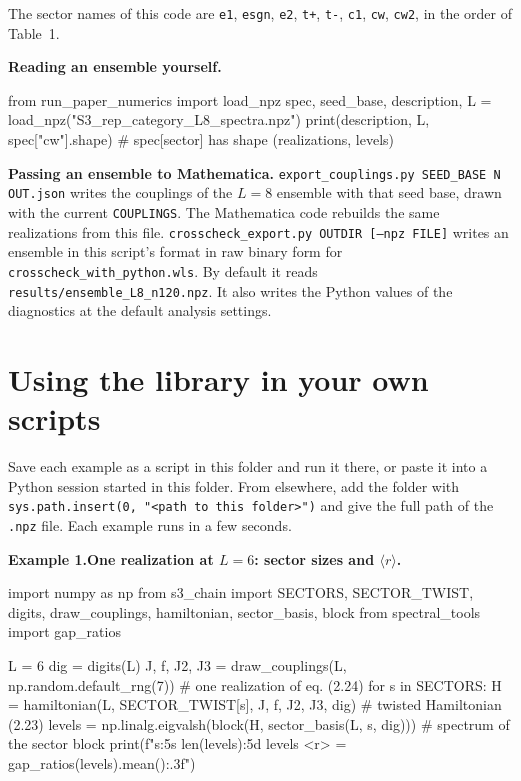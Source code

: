 \documentclass[11pt,a4paper]{article}
\newcommand{\code}[1]{\texttt{\textcolor{codeink}{#1}}}
\newcommand{\lead}[1]{\textbf{#1}\enspace}
\newcommand{\example}[2]{\par\needspace{7\baselineskip}\medskip
  {\color{accent}\bfseries Example #1.}\enspace\textbf{#2}\par\nopagebreak}
\begin{document}
The sector names of this code are \code{e1}, \code{esgn}, \code{e2}, \code{t+}, \code{t-}, \code{c1}, \code{cw},
\code{cw2}, in the order of Table~1.

\lead{Reading an ensemble yourself.}
\begin{python}
from run_paper_numerics import load_npz
spec, seed_base, description, L = load_npz("S3_rep_category_L8_spectra.npz")
print(description, L, spec["cw"].shape)       # spec[sector] has shape (realizations, levels)
\end{python}

\lead{Passing an ensemble to Mathematica.} \code{export\_couplings.py SEED\_BASE N OUT.json} writes the couplings
of the $L = 8$ ensemble with that seed base, drawn with the current \code{COUPLINGS}. The Mathematica code rebuilds
the same realizations from this file. \code{crosscheck\_export.py OUTDIR [--npz FILE]} writes an ensemble in this
script's format in raw binary form for \code{crosscheck\_with\_python.wls}. By default it reads
\code{results/ensemble\_L8\_n120.npz}. It also writes the Python values of the diagnostics at the default analysis
settings.

\section{Using the library in your own scripts}\label{sec:library}

Save each example as a script in this folder and run it there, or paste it into a Python session started in this
folder. From elsewhere, add the folder with \code{sys.path.insert(0, "<path to this folder>")} and give the full
path of the \code{.npz} file. Each example runs in a few seconds.

\example{1}{One realization at $L = 6$: sector sizes and $\langle r\rangle$.}
\begin{python}
import numpy as np
from s3_chain import SECTORS, SECTOR_TWIST, digits, draw_couplings, hamiltonian, sector_basis, block
from spectral_tools import gap_ratios

L = 6
dig = digits(L)
J, f, J2, J3 = draw_couplings(L, np.random.default_rng(7))           # one realization of eq. (2.24)
for s in SECTORS:
    H = hamiltonian(L, SECTOR_TWIST[s], J, f, J2, J3, dig)            # twisted Hamiltonian (2.23)
    levels = np.linalg.eigvalsh(block(H, sector_basis(L, s, dig)))    # spectrum of the sector block
    print(f"{s:5s} {len(levels):5d} levels   <r> = {gap_ratios(levels).mean():.3f}")
\end{python}
\end{document}
